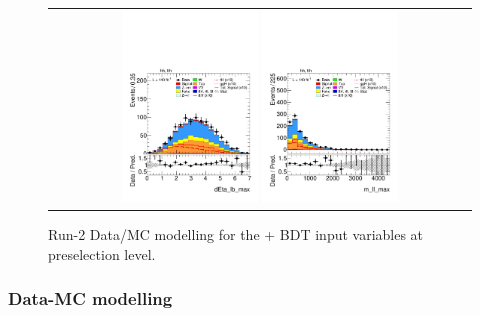 \begin{figure}[htbp]
\begin{tabular}{@{}c c c@{}}
    \multicolumn{3}{c}{%
      \includegraphics[width=0.33\textwidth]{images/plots_modelling_run2_run3_variables/run_2_tth/plot_dEta_lb_max_hh_tth_15_16_17_18.pdf}%
      \hspace{1.5pt}%
      \includegraphics[width=0.33\textwidth]{images/plots_modelling_run2_run3_variables/run_2_tth/plot_m_ll_max_hh_tth_15_16_17_18.pdf}%
    }\\
  \end{tabular}

  \caption{Run-2 Data/MC modelling for the \thqb + \ttH BDT input variables at preselection level.}
  \label{tth_vars_modelling_run3_2}
\end{figure}


\subsubsection*{Data-MC modelling}


